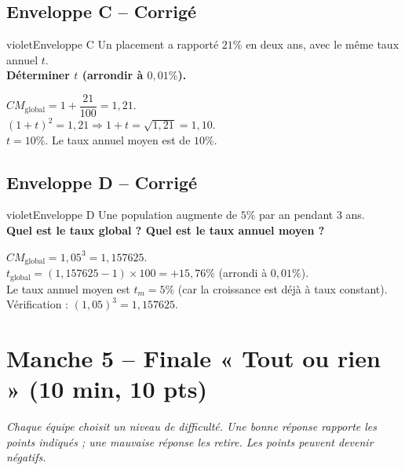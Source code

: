 \documentclass[12pt,a4paper]{article}
\begin{document}
\subsection*{Enveloppe C -- Corrigé}

\begin{carte}{violet}{Enveloppe C}
Un placement a rapporté \(21\%\) en deux ans, avec le même taux annuel \(t\).\\[0.3cm]
\textbf{Déterminer \(t\) (arrondir à \(0{,}01\%\)).}
\end{carte}
\begin{corrige}
\(CM_{\text{global}} = 1 + \dfrac{21}{100} = 1{,}21\).\\[0.2cm]
\((1+t)^2 = 1{,}21 \Rightarrow 1+t = \sqrt{1{,}21} = 1{,}10\).\\[0.2cm]
\(t = 10\%\). Le taux annuel moyen est de \(10\%\).
\end{corrige}

\subsection*{Enveloppe D -- Corrigé}

\begin{carte}{violet}{Enveloppe D}
Une population augmente de \(5\%\) par an pendant 3 ans.\\[0.3cm]
\textbf{Quel est le taux global ? Quel est le taux annuel moyen ?}
\end{carte}
\begin{corrige}
\(CM_{\text{global}} = 1{,}05^3 = 1{,}157625\).\\[0.2cm]
\(t_{\text{global}} = (1{,}157625 - 1) \times 100 = +15{,}76\%\) (arrondi à \(0{,}01\%\)).\\[0.2cm]
Le taux annuel moyen est \(t_m = 5\%\) (car la croissance est déjà à taux constant).\\[0.2cm]
Vérification : \((1{,}05)^3 = 1{,}157625\).
\end{corrige}

\newpage

\section*{Manche 5 -- Finale « Tout ou rien » (10 min, 10 pts)}

\textit{Chaque équipe choisit un niveau de difficulté. Une bonne réponse rapporte les points indiqués ; une mauvaise réponse les retire. Les points peuvent devenir négatifs.}
\end{document}
